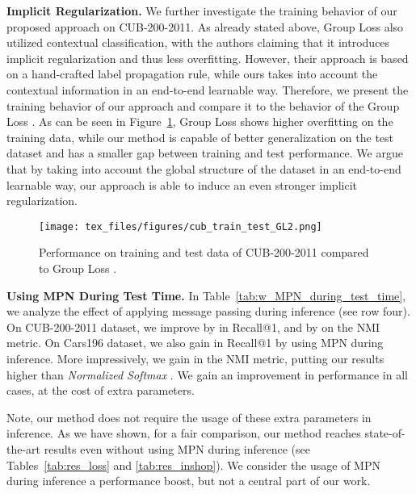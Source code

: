 \documentclass{article}
\begin{document}
\noindent\textbf{Implicit Regularization.} We further investigate the training behavior of our proposed approach on CUB-200-2011. As already stated above, Group Loss \cite{DBLP:conf/eccv/GrLoss} also utilized contextual classification, with the authors claiming that it introduces implicit regularization and thus less overfitting. However, their approach is based on a hand-crafted label propagation rule, while ours takes into account the contextual information in an end-to-end learnable way. Therefore, we present the training behavior of our approach and compare it to the behavior of the Group Loss \cite{DBLP:conf/eccv/GrLoss}.
As can be seen in Figure~\ref{fig:cub_train_test}, Group Loss \cite{DBLP:conf/eccv/GrLoss} shows higher overfitting on the training data, while our method is capable of better generalization on the test dataset and has a smaller gap between training and test performance. We argue that by taking into account the global structure of the dataset in an end-to-end learnable way, our approach is able to induce an even stronger implicit regularization.

\begin{figure}[htb]
    \vspace{-0.3cm}
    \begin{center}
    \centerline{\texttt{[image: tex\_files/figures/cub\_train\_test\_GL2.png]}}
    \caption{Performance on training and test data of CUB-200-2011 compared to Group Loss \cite{DBLP:conf/eccv/GrLoss}.}
    \label{fig:cub_train_test}
    \end{center}
    \vspace{-0.2cm}
\end{figure}

\noindent\textbf{Using MPN During Test Time.} In Table~\ref{tab:w_MPN_during_test_time}, we analyze the effect of applying message passing during inference (see row four). On CUB-200-2011 dataset, we improve by  in Recall@1, and by  on the NMI metric. On Cars196 dataset, we also gain  in Recall@1 by using MPN during inference. More impressively, we gain  in the NMI metric, putting our results  higher than \textit{Normalized Softmax} \cite{DBLP:journals/corr/abs-1811-12649}. We gain an improvement in performance in all cases, at the cost of extra parameters.

Note, our method does not require the usage of these extra parameters in inference. As we have shown, for a fair comparison, our method reaches state-of-the-art results even without using MPN during inference (see Tables~\ref{tab:res_loss} and \ref{tab:res_inshop}). We consider the usage of MPN during inference a performance boost, but not a central part of our work.
\end{document}
